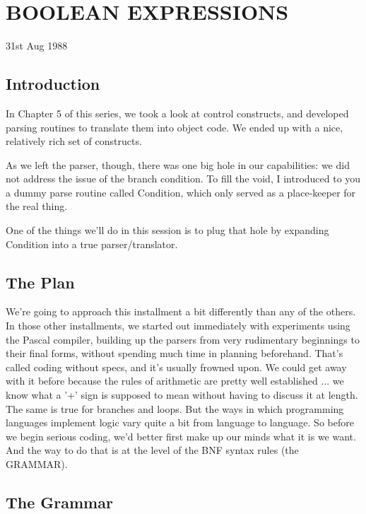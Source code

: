 
\chapter{BOOLEAN EXPRESSIONS}

31st Aug 1988

\section{Introduction}

In Chapter 5 of this series, we took a look at control constructs, and developed parsing  routines  to  translate  them  into object code. We  ended up with a  nice, relatively  rich set of constructs.

As we left  the  parser, though, there  was one big hole in our capabilities:  we  did  not  address  the  issue  of  the  branch condition. To fill the void, I  introduced to you a dummy parse routine called Condition, which only served as a place-keeper for the real thing.

One of the things we'll do in this session is  to  plug that hole by expanding Condition into a true parser/translator.

\section{The Plan}

We're going to  approach  this installment a bit differently than any of the others. In those other installments, we started out immediately with experiments  using the Pascal compiler, building up the parsers from  very  rudimentary  beginnings to their final forms, without spending much time in planning  beforehand. That's called coding without specs, and it's usually frowned  upon. We could get away with it before because the rules of arithmetic are pretty well established ... we  know what a '+' sign is supposed to mean without having to discuss it at length. The same is true for branches and  loops. But  the  ways  in  which programming languages  implement  logic  vary quite a bit  from  language  to language. So before we begin serious coding, we'd  better first make up our minds what it is we want. And the way to do  that is at the level of the BNF syntax rules (the GRAMMAR).

\section{The Grammar}

